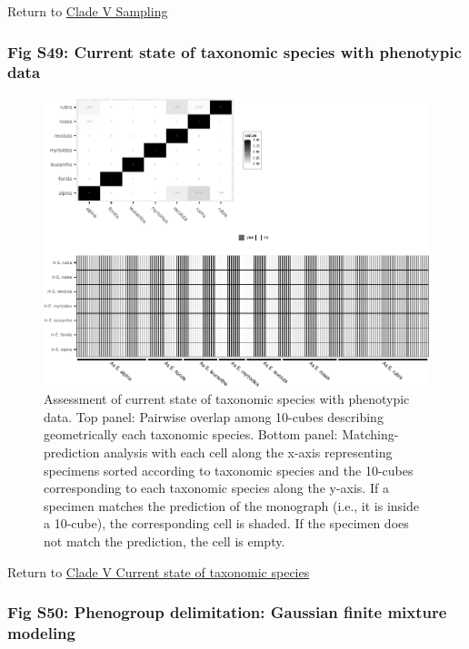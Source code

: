 \documentclass[
  11pt,
]{article}
\begin{document}
Return to \protect\hyperlink{sampling-5}{Clade V Sampling}
\pagebreak

\pagebreak

\hypertarget{fig-s49-current-state-of-taxonomic-species-with-phenotypic-data}{%
\subsubsection{Fig S49: Current state of taxonomic species with phenotypic data}\label{fig-s49-current-state-of-taxonomic-species-with-phenotypic-data}}

\begin{figure}
\includegraphics{Supplementary_Material_files/figure-latex/currentStateOfTaxonomyCladeVPlots-1} \caption{Assessment of current state of taxonomic species with phenotypic data. Top panel: Pairwise overlap among 10-cubes describing geometrically each taxonomic species. Bottom panel: Matching-prediction analysis with each cell along the x-axis representing specimens sorted according to taxonomic species and the 10-cubes corresponding to each taxonomic species along the y-axis. If a specimen matches the prediction of the monograph (i.e., it is inside a 10-cube), the corresponding cell is shaded. If the specimen does not match the prediction, the cell is empty.}\label{fig:currentStateOfTaxonomyCladeVPlots}
\end{figure}

Return to \protect\hyperlink{current-state-of-taxonomic-species-4}{Clade V Current state of taxonomic species}
\pagebreak

\hypertarget{fig-s50-phenogroup-delimitation-gaussian-finite-mixture-modeling}{%
\subsubsection{Fig S50: Phenogroup delimitation: Gaussian finite mixture modeling}\label{fig-s50-phenogroup-delimitation-gaussian-finite-mixture-modeling}}
\end{document}
